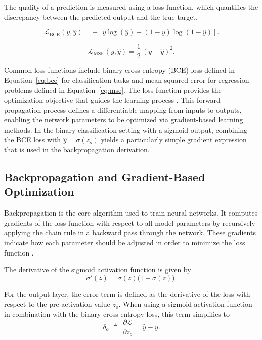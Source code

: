 The quality of a prediction is measured using a loss function, which quantifies the discrepancy between the predicted output and the true target. 

\begin{equation}
\mathcal{L}_{\mathrm{BCE}}(y,\hat{y}) = -\left[y \log(\hat{y}) + (1-y)\log(1-\hat{y})\right].
\label{eq:bce}
\end{equation}

\begin{equation}
\mathcal{L}_{\mathrm{MSE}}(y,\hat{y}) = \frac{1}{2}\,(y-\hat{y})^2.
\label{eq:mse}
\end{equation}

Common loss functions include binary cross-entropy (BCE) loss defined in Equation~\eqref{eq:bce} for classification tasks and mean squared error for regression problems defined in Equation~\eqref{eq:mse}. The loss function provides the optimization objective that guides the learning process \cite{elharrouss2025taskbasedlossfunctionscomputer}.
This forward propagation process defines a differentiable mapping from inputs to outputs, enabling the network parameters to be optimized via gradient-based learning methods. In the binary classification setting with a sigmoid output, combining the BCE loss with $\hat{y}=\sigma(z_o)$ yields a particularly simple gradient expression that is used in the backpropagation derivation.

\subsection{Backpropagation and Gradient-Based Optimization}

Backpropagation is the core algorithm used to train neural networks. It computes gradients of the loss function with respect to all model parameters by recursively applying the chain rule in a backward pass through the network. These gradients indicate how each parameter should be adjusted in order to minimize the loss function \cite{RAZAVI2021105159}.

The derivative of the sigmoid activation function is given by
\begin{equation}
\sigma'(z) = \sigma(z)\bigl(1-\sigma(z)\bigr).
\end{equation}

For the output layer, the error term is defined as the derivative of the loss with respect to the pre-activation value $z_o$. When using a sigmoid activation function in combination with the binary cross-entropy loss, this term simplifies to
\begin{equation}
\delta_o \;\triangleq\; \frac{\partial \mathcal{L}}{\partial z_o}
= \hat{y} - y.
\end{equation}

